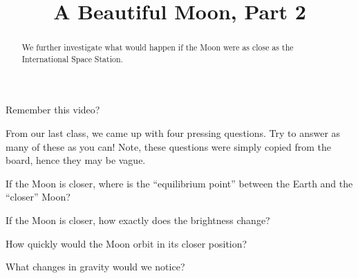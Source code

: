 \documentclass{ximera}
\title{A Beautiful Moon, Part 2}
\begin{document}
\begin{abstract}
We further investigate what would happen if the Moon were as close as the
International Space Station.
\end{abstract}
\maketitle
Remember this video?



From our last class, we came up with four pressing questions. Try to
answer as many of these as you can! Note, these questions were simply
copied from the board, hence they may be vague.

\begin{problem}
  If the Moon is closer, where is the ``equilibrium point'' between the
  Earth and the ``closer'' Moon?
\end{problem}

\begin{problem}
  If the Moon is closer, how exactly does the brightness change?
\end{problem}

\begin{problem}
  How quickly would the Moon orbit in its closer position?
\end{problem}

\begin{problem}
  What changes in gravity would we notice?
\end{problem}
\end{document}
